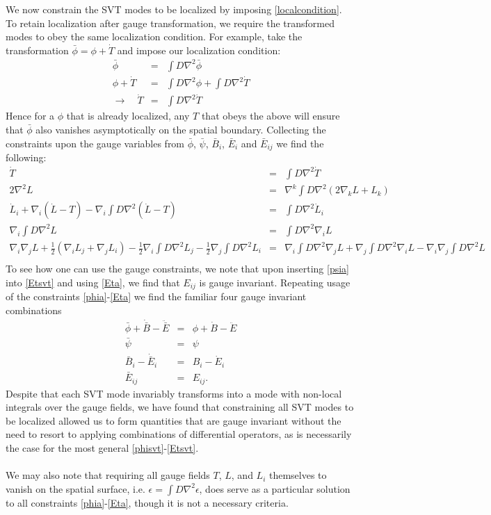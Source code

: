 \documentclass[10pt,letterpaper]{article}
\numberwithin{equation}{section}
\begin{document}
We now constrain the SVT modes to be localized by imposing \eqref{localcondition}. To retain localization after gauge transformation, we require the transformed modes to obey the same localization condition. For example, take the transformation $\bar \phi =\phi + \dot T$ and impose our localization condition:
\begin{eqnarray}
\bar \phi &=& \int D \nabla^2 \bar \phi
\nonumber\\
\phi + \dot T &=& \int D \nabla^2 \phi + \int D \nabla^2 \dot T
\nonumber\\
\to\quad \dot T &=& \int D \nabla^2 \dot T
\end{eqnarray}
Hence for a $\phi$ that is already localized, any $T$ that obeys the above will ensure that $\bar\phi$ also vanishes asymptotically on the spatial boundary. Collecting the constraints upon the gauge variables from $\bar \phi$, $\bar \psi$, $\bar B_i$, $\bar E_i$ and $\bar E_{ij}$ we find the following:
\begin{eqnarray}
\dot T &=& \int D \nabla^2 \dot T
\label{phia}
\\
2\nabla^2 L &=& \nabla^k \int D \nabla^2 (2\nabla_k L + L_k)
\label{psia}
\\
\dot L_i+\nabla_i(\dot L-T) - \nabla_i \int D \nabla^2(\dot L-T) &=& \int D \nabla^2 \dot L_i
\label{Bia}
\\ 
\nabla_i \int D \nabla^2 L &=& \int D \nabla^2 \nabla_i L
\label{Eia}
\\
\nabla_i \nabla_j L +\tfrac12 (\nabla_i L_j + \nabla_j L_i) - \tfrac12 \nabla_i \int D \nabla^2 L_j -\tfrac12 \nabla_j \int D\nabla^2 L_i
&=& \nabla_i \int D \nabla^2 \nabla_j L + \nabla_j \int D \nabla^2 \nabla_i L - \nabla_i\nabla_j \int D \nabla^2 L
 \nonumber\\
\label{Eta}
\end{eqnarray}
To see how one can use the gauge constraints, we note that upon inserting \eqref{psia} into \eqref{Etsvt} and using \eqref{Eta}, we find that $E_{ij}$ is gauge invariant. Repeating usage of the constraints \eqref{phia}-\eqref{Eta} we find the familiar four gauge invariant combinations
\begin{eqnarray}
\bar \phi + \dot{\bar B}-\ddot{\bar E} &=& \phi + \dot B-\ddot E
\nonumber\\
\bar \psi &=& \psi
\nonumber\\
\bar B_i - \dot{\bar E}_i &=& B_i - \dot E_i
\nonumber\\
\bar E_{ij} &=& E_{ij}.
\end{eqnarray}
Despite that each SVT mode invariably transforms into a mode with non-local integrals over the gauge fields, we have found that constraining all SVT modes to be localized allowed us to form quantities that are gauge invariant without the need to resort to applying combinations of differential operators, as is necessarily the case for the most general \eqref{phisvt}-\eqref{Etsvt}. 
\\ \\
We may also note that requiring all gauge fields $T$, $L$, and $L_i$ themselves to vanish on the spatial surface, i.e. $\epsilon = \int D \nabla^2 \epsilon$, does serve as a particular solution to all constraints \eqref{phia}-\eqref{Eta}, though it is not a necessary criteria. 
\end{document}
